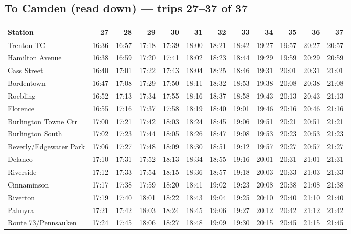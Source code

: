 \subsection*{To Camden (read down) --- trips 27--37 of 37}
\begin{center}\footnotesize\setlength{\tabcolsep}{3pt}\begin{tabular}{@{}lrrrrrrrrrrr@{}}\toprule
Station & 27 & 28 & 29 & 30 & 31 & 32 & 33 & 34 & 35 & 36 & 37 \\\midrule
Trenton TC & 16:36 & 16:57 & 17:18 & 17:39 & 18:00 & 18:21 & 18:42 & 19:27 & 19:57 & 20:27 & 20:57 \\
Hamilton Avenue & 16:38 & 16:59 & 17:20 & 17:41 & 18:02 & 18:23 & 18:44 & 19:29 & 19:59 & 20:29 & 20:59 \\
Cass Street & 16:40 & 17:01 & 17:22 & 17:43 & 18:04 & 18:25 & 18:46 & 19:31 & 20:01 & 20:31 & 21:01 \\
Bordentown & 16:47 & 17:08 & 17:29 & 17:50 & 18:11 & 18:32 & 18:53 & 19:38 & 20:08 & 20:38 & 21:08 \\
Roebling & 16:52 & 17:13 & 17:34 & 17:55 & 18:16 & 18:37 & 18:58 & 19:43 & 20:13 & 20:43 & 21:13 \\
Florence & 16:55 & 17:16 & 17:37 & 17:58 & 18:19 & 18:40 & 19:01 & 19:46 & 20:16 & 20:46 & 21:16 \\
Burlington Towne Ctr & 17:00 & 17:21 & 17:42 & 18:03 & 18:24 & 18:45 & 19:06 & 19:51 & 20:21 & 20:51 & 21:21 \\
Burlington South & 17:02 & 17:23 & 17:44 & 18:05 & 18:26 & 18:47 & 19:08 & 19:53 & 20:23 & 20:53 & 21:23 \\
Beverly/Edgewater Park & 17:06 & 17:27 & 17:48 & 18:09 & 18:30 & 18:51 & 19:12 & 19:57 & 20:27 & 20:57 & 21:27 \\
Delanco & 17:10 & 17:31 & 17:52 & 18:13 & 18:34 & 18:55 & 19:16 & 20:01 & 20:31 & 21:01 & 21:31 \\
Riverside & 17:12 & 17:33 & 17:54 & 18:15 & 18:36 & 18:57 & 19:18 & 20:03 & 20:33 & 21:03 & 21:33 \\
Cinnaminson & 17:17 & 17:38 & 17:59 & 18:20 & 18:41 & 19:02 & 19:23 & 20:08 & 20:38 & 21:08 & 21:38 \\
Riverton & 17:19 & 17:40 & 18:01 & 18:22 & 18:43 & 19:04 & 19:25 & 20:10 & 20:40 & 21:10 & 21:40 \\
Palmyra & 17:21 & 17:42 & 18:03 & 18:24 & 18:45 & 19:06 & 19:27 & 20:12 & 20:42 & 21:12 & 21:42 \\
Route 73/Pennsauken & 17:24 & 17:45 & 18:06 & 18:27 & 18:48 & 19:09 & 19:30 & 20:15 & 20:45 & 21:15 & 21:45 \\

\end{tabular}
\end{center}
